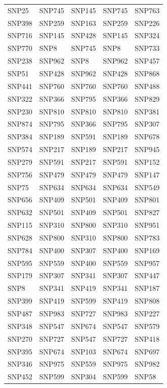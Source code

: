 \begin{table}[ht]
\begin{tabular}{lllll}
  SNP25 & SNP745 & SNP145 & SNP745 & SNP763 \\ 
  SNP398 & SNP259 & SNP163 & SNP259 & SNP226 \\ 
  SNP716 & SNP145 & SNP428 & SNP145 & SNP324 \\ 
  SNP770 & SNP8 & SNP745 & SNP8 & SNP733 \\ 
  SNP238 & SNP962 & SNP8 & SNP962 & SNP457 \\ 
  SNP51 & SNP428 & SNP962 & SNP428 & SNP868 \\ 
  SNP441 & SNP760 & SNP760 & SNP760 & SNP488 \\ 
  SNP322 & SNP366 & SNP795 & SNP366 & SNP829 \\ 
  SNP230 & SNP810 & SNP810 & SNP810 & SNP381 \\ 
  SNP874 & SNP795 & SNP366 & SNP795 & SNP307 \\ 
  SNP384 & SNP189 & SNP591 & SNP189 & SNP678 \\ 
  SNP574 & SNP217 & SNP189 & SNP217 & SNP945 \\ 
  SNP279 & SNP591 & SNP217 & SNP591 & SNP152 \\ 
  SNP756 & SNP479 & SNP479 & SNP479 & SNP147 \\ 
  SNP75 & SNP634 & SNP634 & SNP634 & SNP549 \\ 
  SNP656 & SNP409 & SNP501 & SNP409 & SNP801 \\ 
  SNP632 & SNP501 & SNP409 & SNP501 & SNP827 \\ 
  SNP115 & SNP310 & SNP800 & SNP310 & SNP951 \\ 
  SNP628 & SNP800 & SNP310 & SNP800 & SNP783 \\ 
  SNP784 & SNP400 & SNP307 & SNP400 & SNP169 \\ 
  SNP595 & SNP559 & SNP400 & SNP559 & SNP957 \\ 
  SNP179 & SNP307 & SNP341 & SNP307 & SNP447 \\ 
  SNP8 & SNP341 & SNP419 & SNP341 & SNP187 \\ 
  SNP399 & SNP419 & SNP599 & SNP419 & SNP808 \\ 
  SNP487 & SNP983 & SNP727 & SNP983 & SNP227 \\ 
  SNP348 & SNP547 & SNP674 & SNP547 & SNP579 \\ 
  SNP270 & SNP727 & SNP547 & SNP727 & SNP418 \\ 
  SNP395 & SNP674 & SNP103 & SNP674 & SNP697 \\ 
  SNP346 & SNP975 & SNP559 & SNP975 & SNP982 \\ 
  SNP452 & SNP599 & SNP304 & SNP599 & SNP58 \\ 

\end{tabular}
\end{table}
